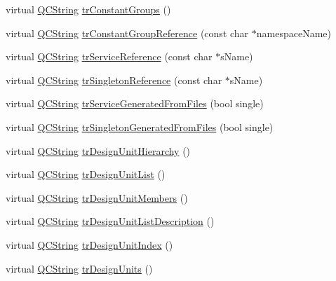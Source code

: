 \begin{DoxyCompactItemize}
virtual \mbox{\hyperlink{class_q_c_string}{Q\+C\+String}} \mbox{\hyperlink{class_translator_german_a06fc615f8229fed6228813777275880e}{tr\+Constant\+Groups}} ()
\item 
virtual \mbox{\hyperlink{class_q_c_string}{Q\+C\+String}} \mbox{\hyperlink{class_translator_german_a920f9105e4f8edb916bd27581b6979f3}{tr\+Constant\+Group\+Reference}} (const char $\ast$namespace\+Name)
\item 
virtual \mbox{\hyperlink{class_q_c_string}{Q\+C\+String}} \mbox{\hyperlink{class_translator_german_accb43a522c962ba0e447f69cbd5bdddf}{tr\+Service\+Reference}} (const char $\ast$s\+Name)
\item 
virtual \mbox{\hyperlink{class_q_c_string}{Q\+C\+String}} \mbox{\hyperlink{class_translator_german_a27bf47f55aeaa123001294c7d72e4452}{tr\+Singleton\+Reference}} (const char $\ast$s\+Name)
\item 
virtual \mbox{\hyperlink{class_q_c_string}{Q\+C\+String}} \mbox{\hyperlink{class_translator_german_a4c5a99781404c1486ef1d9648cc441b3}{tr\+Service\+Generated\+From\+Files}} (bool single)
\item 
virtual \mbox{\hyperlink{class_q_c_string}{Q\+C\+String}} \mbox{\hyperlink{class_translator_german_ae9a88a6bae43a58f68e0b9eb6e8f2401}{tr\+Singleton\+Generated\+From\+Files}} (bool single)
\item 
virtual \mbox{\hyperlink{class_q_c_string}{Q\+C\+String}} \mbox{\hyperlink{class_translator_german_a7b653aded20e89a5d96f937619923c64}{tr\+Design\+Unit\+Hierarchy}} ()
\item 
virtual \mbox{\hyperlink{class_q_c_string}{Q\+C\+String}} \mbox{\hyperlink{class_translator_german_a4f409aa29f4cfe06bd746e0f3ca0f404}{tr\+Design\+Unit\+List}} ()
\item 
virtual \mbox{\hyperlink{class_q_c_string}{Q\+C\+String}} \mbox{\hyperlink{class_translator_german_a1bc88a369e1802d493c218cda7491ede}{tr\+Design\+Unit\+Members}} ()
\item 
virtual \mbox{\hyperlink{class_q_c_string}{Q\+C\+String}} \mbox{\hyperlink{class_translator_german_a8f039b8422c2811c44487f2c9ec133ec}{tr\+Design\+Unit\+List\+Description}} ()
\item 
virtual \mbox{\hyperlink{class_q_c_string}{Q\+C\+String}} \mbox{\hyperlink{class_translator_german_a0d6d09616c72d7a4b8c476a3ebab58a9}{tr\+Design\+Unit\+Index}} ()
\item 
virtual \mbox{\hyperlink{class_q_c_string}{Q\+C\+String}} \mbox{\hyperlink{class_translator_german_a2fa1eefb9fd013ec26109ff5b77a85a1}{tr\+Design\+Units}} ()

\end{DoxyCompactItemize}
